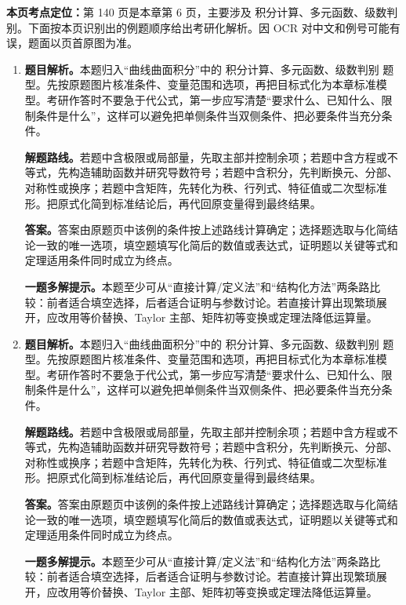 \begin{solutionblock}
\textbf{本页考点定位：}第 140 页是本章第 6 页，主要涉及 积分计算、多元函数、级数判别。下面按本页识别出的例题顺序给出考研化解析。因 OCR 对中文和例号可能有误，题面以页首原图为准。

\begin{enumerate}[label=\textbf{例\arabic*.}, leftmargin=2.4em]

\item \textbf{题目解析。}本题归入“曲线曲面积分”中的 积分计算、多元函数、级数判别 题型。先按原题图片核准条件、变量范围和选项，再把目标式化为本章标准模型。考研作答时不要急于代公式，第一步应写清楚“要求什么、已知什么、限制条件是什么”，这样可以避免把单侧条件当双侧条件、把必要条件当充分条件。

\textbf{解题路线。}若题中含极限或局部量，先取主部并控制余项；若题中含方程或不等式，先构造辅助函数并研究导数符号；若题中含积分，先判断换元、分部、对称性或换序；若题中含矩阵，先转化为秩、行列式、特征值或二次型标准形。把原式化简到标准结论后，再代回原变量得到最终结果。

\textbf{答案。}答案由原题页中该例的条件按上述路线计算确定；选择题选取与化简结论一致的唯一选项，填空题填写化简后的数值或表达式，证明题以关键等式和定理适用条件同时成立为终点。

\textbf{一题多解提示。}本题至少可从“直接计算/定义法”和“结构化方法”两条路比较：前者适合填空选择，后者适合证明与参数讨论。若直接计算出现繁琐展开，应改用等价替换、Taylor 主部、矩阵初等变换或定理法降低运算量。

\item \textbf{题目解析。}本题归入“曲线曲面积分”中的 积分计算、多元函数、级数判别 题型。先按原题图片核准条件、变量范围和选项，再把目标式化为本章标准模型。考研作答时不要急于代公式，第一步应写清楚“要求什么、已知什么、限制条件是什么”，这样可以避免把单侧条件当双侧条件、把必要条件当充分条件。

\textbf{解题路线。}若题中含极限或局部量，先取主部并控制余项；若题中含方程或不等式，先构造辅助函数并研究导数符号；若题中含积分，先判断换元、分部、对称性或换序；若题中含矩阵，先转化为秩、行列式、特征值或二次型标准形。把原式化简到标准结论后，再代回原变量得到最终结果。

\textbf{答案。}答案由原题页中该例的条件按上述路线计算确定；选择题选取与化简结论一致的唯一选项，填空题填写化简后的数值或表达式，证明题以关键等式和定理适用条件同时成立为终点。

\textbf{一题多解提示。}本题至少可从“直接计算/定义法”和“结构化方法”两条路比较：前者适合填空选择，后者适合证明与参数讨论。若直接计算出现繁琐展开，应改用等价替换、Taylor 主部、矩阵初等变换或定理法降低运算量。

\end{enumerate}
\end{solutionblock}



